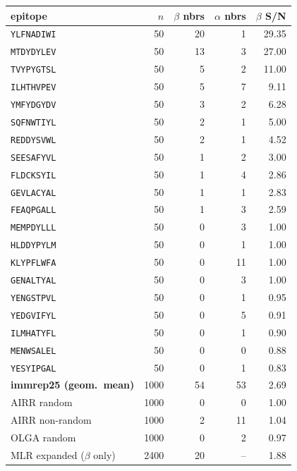 \begin{tabular}{lrrrr}
\toprule
epitope & $n$ & $\beta$ nbrs & $\alpha$ nbrs & $\beta$ S/N \\
\midrule
\texttt{YLFNADIWI} & 50 & 20 & 1 & 29.35 \\
\texttt{MTDYDYLEV} & 50 & 13 & 3 & 27.00 \\
\texttt{TVYPYGTSL} & 50 & 5 & 2 & 11.00 \\
\texttt{ILHTHVPEV} & 50 & 5 & 7 & 9.11 \\
\texttt{YMFYDGYDV} & 50 & 3 & 2 & 6.28 \\
\texttt{SQFNWTIYL} & 50 & 2 & 1 & 5.00 \\
\texttt{REDDYSVWL} & 50 & 2 & 1 & 4.52 \\
\texttt{SEESAFYVL} & 50 & 1 & 2 & 3.00 \\
\texttt{FLDCKSYIL} & 50 & 1 & 4 & 2.86 \\
\texttt{GEVLACYAL} & 50 & 1 & 1 & 2.83 \\
\texttt{FEAQPGALL} & 50 & 1 & 3 & 2.59 \\
\texttt{MEMPDYLLL} & 50 & 0 & 3 & 1.00 \\
\texttt{HLDDYPYLM} & 50 & 0 & 1 & 1.00 \\
\texttt{KLYPFLWFA} & 50 & 0 & 11 & 1.00 \\
\texttt{GENALTYAL} & 50 & 0 & 3 & 1.00 \\
\texttt{YENGSTPVL} & 50 & 0 & 1 & 0.95 \\
\texttt{YEDGVIFYL} & 50 & 0 & 5 & 0.91 \\
\texttt{ILMHATYFL} & 50 & 0 & 1 & 0.90 \\
\texttt{MENWSALEL} & 50 & 0 & 0 & 0.88 \\
\texttt{YESYIPGAL} & 50 & 0 & 1 & 0.83 \\
\midrule
\textbf{immrep25 (geom.\ mean)} & 1000 & 54 & 53 & 2.69 \\
AIRR random & 1000 & 0 & 0 & 1.00 \\
AIRR non-random & 1000 & 2 & 11 & 1.04 \\
OLGA random & 1000 & 0 & 2 & 0.97 \\
MLR expanded ($\beta$ only) & 2400 & 20 & -- & 1.88 \\
\bottomrule
\end{tabular}
